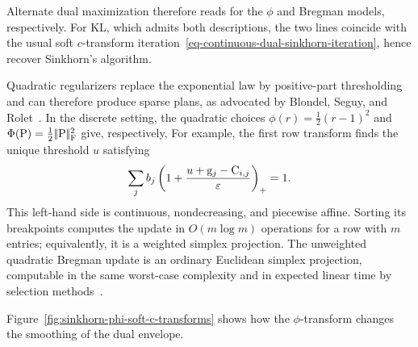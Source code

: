 Alternate dual maximization therefore reads
for the $\phi$ and Bregman models, respectively. For KL, which admits both descriptions, the two lines coincide with the usual soft $c$-transform iteration~\eqref{eq-continuous-dual-sinkhorn-iteration}, hence recover Sinkhorn's algorithm.

Quadratic regularizers replace the exponential law by positive-part thresholding and can therefore produce sparse plans, as advocated by Blondel, Seguy, and Rolet~\cite{blondel2018smooth}. In the discrete setting, the quadratic choices $\phi(r)=\frac12(r-1)^2$ and $\Phi(\mathrm{P})=\frac12|\!| \mathrm{P} |\!|_{\mathrm F}^2$ give, respectively,
For example, the first row transform finds the unique threshold $u$ satisfying
\[
	\sum_j b_j\left(1+\frac{u+\mathrm{g}_j-\mathrm{C}_{i,j}}{\varepsilon}\right)_+=1.
\]
This left-hand side is continuous, nondecreasing, and piecewise affine. Sorting its breakpoints computes the update in $O(m\log m)$ operations for a row with $m$ entries; equivalently, it is a weighted simplex projection. The unweighted quadratic Bregman update is an ordinary Euclidean simplex projection, computable in the same worst-case complexity and in expected linear time by selection methods~\cite{blondel2018smooth}.

Figure~\ref{fig:sinkhorn-phi-soft-c-transforms} shows how the $\phi$-transform changes the smoothing of the dual envelope.


